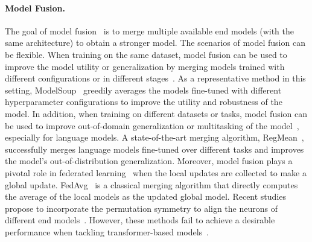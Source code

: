 \paragraph{Model Fusion.}
The goal of model fusion~\citep{li2023deep} is to merge multiple available end models (with the same architecture) to obtain a stronger model.
The scenarios of model fusion can be flexible.
When training on the same dataset, model fusion can be used to improve the model utility or generalization by merging models trained with different configurations or in different stages~\citep{izmailov2018averaging,gupta2020stochastic,cha2021swad,wortsman2022model,rame2022diverse,arpit2022ensemble}.
As a representative method in this setting, ModelSoup~\citep{wortsman2022model} greedily averages the models fine-tuned with different hyperparameter configurations to improve the utility and robustness of the model.
In addition, when training on different datasets or tasks, model fusion can be used to improve out-of-domain generalization or multitasking of the model~\citep{matena2022merging,choshen2022fusing,li2022branch,jin2023dataless}, especially for language models.
A state-of-the-art merging algorithm, RegMean~\citep{jin2023dataless}, successfully merges language models fine-tuned over different tasks and improves the model's out-of-distribution generalization.
Moreover, model fusion plays a pivotal role in federated learning~\citep{konevcny2016federated,mcmahan2017communication,wang2020federated} when the local updates are collected to make a global update.
FedAvg~\citep{mcmahan2017communication} is a classical merging algorithm that directly computes the average of the local models as the updated global model.
Recent studies propose to incorporate the permutation symmetry to align the neurons of different end models~\citep{wang2020federated,singh2020model,ainsworth2023git}.
However, these methods fail to achieve a desirable performance when tackling transformer-based models~\citep{jin2023dataless}.